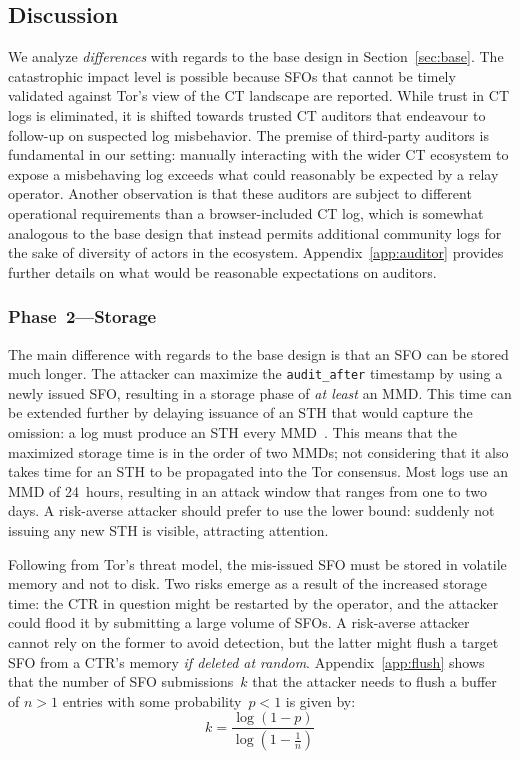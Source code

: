 \subsection{Discussion} \label{sec:auditor:analysis}
We analyze \emph{differences} with regards to the base design in
Section~\ref{sec:base}.  The catastrophic impact level is possible because SFOs
that cannot be timely validated against Tor's view of the CT landscape are
reported.  While trust in CT logs is eliminated, it is shifted towards trusted
CT auditors that endeavour to follow-up on suspected log misbehavior. The
premise of third-party auditors is fundamental in our setting: manually
interacting with the wider CT ecosystem to expose a misbehaving log exceeds what
could reasonably be expected by a relay operator. Another observation is that
these auditors are subject to different operational requirements than a
browser-included CT log, which is somewhat analogous to the base design that
instead permits additional community logs for the sake of diversity of actors in
the ecosystem. Appendix~\ref{app:auditor} provides further details on what would
be reasonable expectations on auditors.

\subsubsection{Phase~2---Storage} \label{sec:auditor:analysis:phase2}
The main difference with regards to the base design is that an SFO can be
stored much longer.  The attacker can maximize the \texttt{audit\_after}
timestamp by using a newly issued SFO, resulting in a storage phase of \emph{at
least} an MMD.  This time can be extended further by delaying issuance of an
STH that would capture the omission:
	a log must produce an STH every MMD~\cite{ct,ct/bis}.
This means that the maximized storage time is in the order of two MMDs; not
considering that it also takes time for an STH to be propagated into the Tor
consensus.  Most logs use an MMD of 24~hours, resulting in an attack window that
ranges from one to two days.  A risk-averse attacker should prefer to use the
lower bound:
	suddenly not issuing any new STH is visible, attracting attention.

Following from Tor's threat model, the mis-issued SFO must be stored in
volatile memory and not to disk.  Two risks emerge as a result of the increased
storage time:
	the CTR in question might be restarted by the operator,
	and the attacker could flood it by submitting a large volume of SFOs.
A risk-averse attacker cannot rely on the former to avoid detection, but the
latter might flush a target SFO from a CTR's memory \emph{if deleted at random}.
Appendix~\ref{app:flush} shows that the number of SFO submissions~$k$ that the
attacker needs to flush a buffer of $n>1$ entries with some probability~$p<1$ is
given by:
\begin{equation} \label{eq:flush}
	k = \frac{\log(1-p)}{\log(1 - \frac{1}{n})}
\end{equation}

